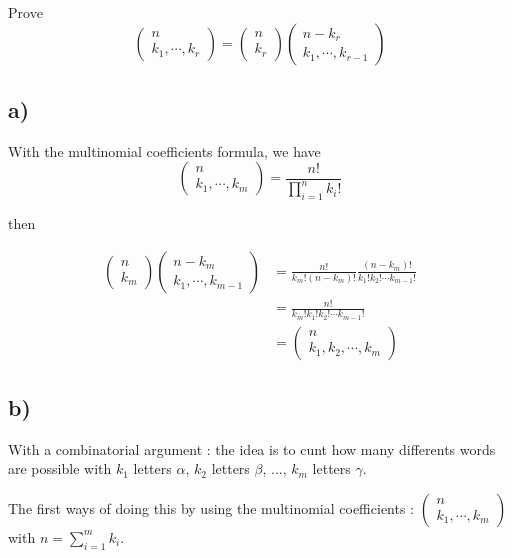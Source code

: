 \documentclass[a4paper,11pt]{report}
\begin{document}
Prove
$$
\begin{pmatrix} n \\ k_1,\cdots,k_r\end{pmatrix} = \begin{pmatrix} n \\
  k_r\end{pmatrix} \begin{pmatrix} n-k_r \\ k_1,\cdots,k_{r-1}\end{pmatrix}
$$

\subsection*{a)} With the multinomial coefficients formula, we have
$$
\begin{pmatrix} n \\ k_1,\cdots,k_m\end{pmatrix} = \frac{n!}{\prod_{i=1}^n k_i!}
$$

then

\begin{align*}
  \begin{pmatrix} n \\ k_m\end{pmatrix} \begin{pmatrix} n-k_m \\ k_1,\cdots,k_{m-1}\end{pmatrix} &= \frac{n!}{k_m!(n-k_m)!} \frac{(n-k_m)!}{k_1!k_2! \cdots k_{m-1} !} \\
                                                                                                &= \frac{n!}{k_m!k_1!k_2!\cdots k_{m-1}!}\\
                                                                                                &= \begin{pmatrix} n \\ k_1,k_2,\cdots,k_m\end{pmatrix}
\end{align*}

\subsection*{b)} With a combinatorial argument : the idea is to cunt how many
differents words are possible with $k_1$ letters $\alpha$, $k_2$ letters
$\beta$, ..., $k_m$ letters $\gamma$.

The first ways of doing this by using the multinomial coefficients :
$\begin{pmatrix} n \\ k_1,\cdots,k_m\end{pmatrix}$ with $n = \sum_{i=1}^mk_i$.
\end{document}

